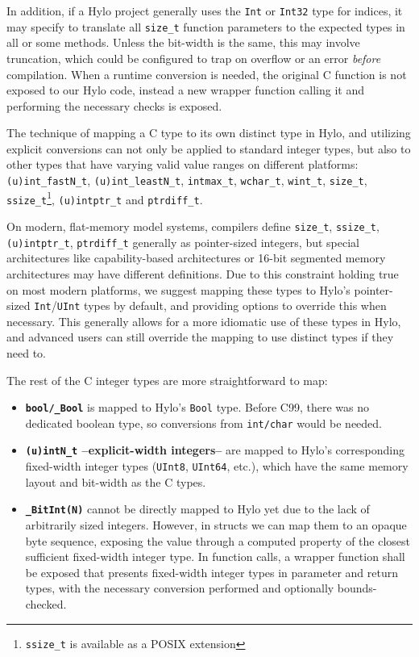 In addition, if a Hylo project generally uses the \texttt{Int} or \texttt{Int32} type for indices, it may specify to translate all \texttt{size\_t} function parameters to the expected types in all or some methods. Unless the bit-width is the same, this may involve truncation, which could be configured to trap on overflow or an error \emph{before} compilation. When a runtime conversion is needed, the original C function is not exposed to our Hylo code, instead a new wrapper function calling it and performing the necessary checks is exposed.

The technique of mapping a C type to its own distinct type in Hylo, and utilizing explicit conversions can not only be applied to standard integer types, but also to other types that have varying valid value ranges on different platforms: \texttt{(u)int\_fastN\_t}, \texttt{(u)int\_leastN\_t}, \texttt{intmax\_t}, \texttt{wchar\_t}, \texttt{wint\_t}, \texttt{size\_t}, \texttt{ssize\_t}\footnote{\texttt{ssize\_t} is available as a POSIX extension}, \texttt{(u)intptr\_t} and \texttt{ptrdiff\_t}.

On modern, flat-memory model systems, compilers define \texttt{size\_t}, \texttt{ssize\_t}, \texttt{(u)intptr\_t}, \texttt{ptrdiff\_t} generally as pointer-sized integers, but special architectures like capability-based architectures\cite{cheri-intro}\cite{hackernews-rust-cheri} or 16-bit segmented memory architectures\cite{arch16-bit} may have different definitions. Due to this constraint holding true on most modern platforms, we suggest mapping these types to Hylo's pointer-sized \texttt{Int}/\texttt{UInt} types by default, and providing options to override this when necessary. This generally allows for a more idiomatic use of these types in Hylo, and advanced users can still override the mapping to use distinct types if they need to.

The rest of the C integer types are more straightforward to map:
\begin{itemize}
    \item \textbf{\texttt{bool/\_Bool}} is mapped to Hylo's \texttt{Bool} type. Before C99, there was no dedicated boolean type, so conversions from \texttt{int/char} would be needed.
    \item \textbf{\texttt{(u)intN\_t} --explicit-width integers--} are mapped to Hylo's corresponding fixed-width integer types (\texttt{UInt8}, \texttt{UInt64}, etc.), which have the same memory layout and bit-width as the C types.
    \item \textbf{\texttt{\_BitInt(N)}} cannot be directly mapped to Hylo yet due to the lack of arbitrarily sized integers. However, in structs we can map them to an opaque byte sequence, exposing the value through a computed property of the closest sufficient fixed-width integer type. In function calls, a wrapper function shall be exposed that presents fixed-width integer types in parameter and return types, with the necessary conversion performed and optionally bounds-checked. 
\end{itemize} 

